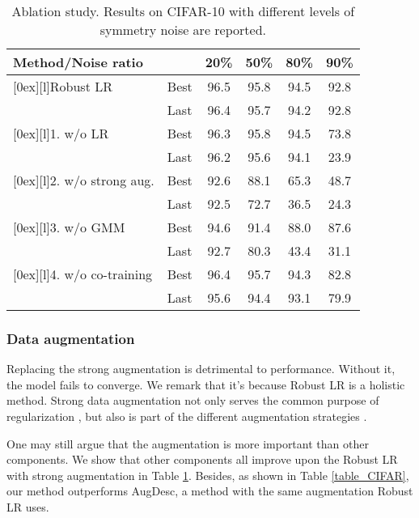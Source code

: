 \documentclass[letterpaper]{article} \usepackage{aaai23}  \usepackage{times}  \usepackage{helvet}  \usepackage{courier}  \usepackage[hyphens]{url}  \usepackage{graphicx} \urlstyle{rm} \def\UrlFont{\rm}  \usepackage{natbib}  \usepackage{caption} \frenchspacing  \setlength{\pdfpagewidth}{8.5in} \setlength{\pdfpageheight}{11in} \usepackage{algorithm}
\begin{document}
\begin{table}
    \centering
    \begin{tabular}{ll|cccc}
        \toprule
		\multicolumn{2}{l|}{Method/Noise ratio}                           & 20\% & 50\% & 80\% & 90\%   \\ \midrule
		\multirowcell{2}[0ex][l]{Robust LR}                               & Best & 96.5 & 95.8 & 94.5 & 92.8   \\
		                                                                  & Last & 96.4 & 95.7 & 94.2 & 92.8   \\ \midrule
		\multirowcell{2}[0ex][l]{1. w/o LR}          & Best & 96.3 & 95.8 & 94.5 & 73.8   \\ & Last & 96.2 & 95.6 & 94.1 & 23.9   \\ \midrule
		\multirowcell{2}[0ex][l]{2. w/o strong aug.}          & Best & 92.6 & 88.1 & 65.3 & 48.7   \\ & Last & 92.5 & 72.7 & 36.5 & 24.3   \\ \midrule
		\multirowcell{2}[0ex][l]{3. w/o GMM}                          & Best & 94.6 & 91.4 & 88.0 & 87.6   \\ & Last & 92.7 & 80.3 & 43.4 & 31.1   \\ \midrule
		\multirowcell{2}[0ex][l]{4. w/o co-training}                  & Best & 96.4 & 95.7 & 94.3 & 82.8   \\ & Last & 95.6 & 94.4 & 93.1 & 79.9   \\ 
        \bottomrule
    \end{tabular}
    \caption{Ablation study. Results on CIFAR-10 with different levels of symmetry noise are reported.}
    \label{table_ab}
\end{table}

\subsubsection{Data augmentation}
Replacing the strong augmentation is detrimental to performance.
Without it, the model fails to converge.
We remark that it's because Robust LR is a holistic method. 
Strong data augmentation not only serves the common purpose of regularization \cite{shorten2019survey}, but also is part of the different augmentation strategies \cite{nishi2021augmentation}.

One may still argue that the augmentation is more important than other components.
We show that other components all improve upon the Robust LR with strong augmentation in Table \ref{table_ab}.
Besides, as shown in Table \ref{table_CIFAR}, our method outperforms AugDesc, a method with the same augmentation Robust LR uses.
\end{document}
